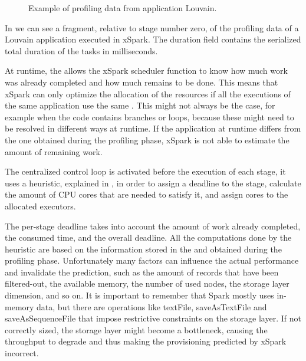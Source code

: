 \begin{figure}
	\centering
	\begin{minipage}{0,65\columnwidth}
	  
	\caption[Example of profiling data from application Louvain]{Example of profiling data from application Louvain.}
	\label{fig:profileFragment}
	\end{minipage}
\end{figure}

In  we can see a fragment, relative to stage number zero, of the profiling data of a Louvain application executed in xSpark.
The duration field contains the serialized total duration of the tasks in milliseconds.

At runtime, the \plan allows the xSpark scheduler function to know how much
work was already completed and how much remains to be done. This means that xSpark can only optimize the allocation of the resources if all the executions of the same application use the same \plan. This might not always be the case, for example when the code contains branches or loops, because these might need to be resolved in different ways at runtime. If the application \plan at runtime differs from the one obtained during the profiling phase, xSpark is not able to estimate the amount of remaining work. 

The centralized control loop is activated before the execution of each stage, it uses a heuristic, explained in , in order to assign a deadline to the stage, calculate the amount of CPU cores that are needed to satisfy it, and assign cores to the allocated executors. 

The per-stage deadline takes into account the amount of work already completed, the consumed time, and the overall deadline. All the computations done by the heuristic are based on the information stored in the \plan and obtained during the profiling phase. Unfortunately
many factors can influence the actual performance and invalidate the prediction, such as the amount of records that have been filtered-out, the available memory, the number of used nodes,
the storage layer dimension, and so on. It is important to remember that Spark mostly uses in-memory data, but there are operations like textFile, saveAsTextFile and saveAsSequenceFile that impose restrictive constraints on the storage layer. If not correctly sized,
the storage layer might become a bottleneck, causing the throughput to degrade and thus making the provisioning predicted by xSpark incorrect.

